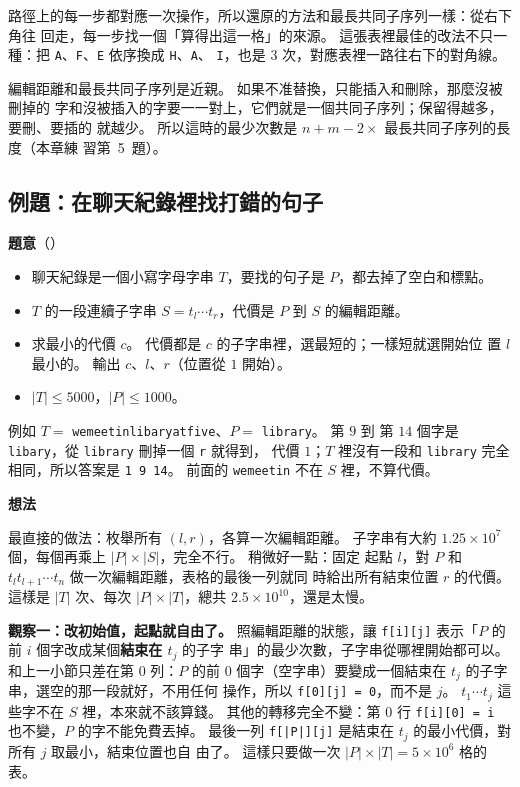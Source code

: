 路徑上的每一步都對應一次操作，所以還原的方法和最長共同子序列一樣：從右下角往
回走，每一步找一個「算得出這一格」的來源。 這張表裡最佳的改法不只一種：把
\texttt{A}、\texttt{F}、\texttt{E} 依序換成 \texttt{H}、\texttt{A}、
\texttt{I}，也是 $3$ 次，對應表裡一路往右下的對角線。

編輯距離和最長共同子序列是近親。 如果不准替換，只能插入和刪除，那麼沒被刪掉的
字和沒被插入的字要一一對上，它們就是一個共同子序列；保留得越多，要刪、要插的
就越少。 所以這時的最少次數是 $n + m - 2 \times$ 最長共同子序列的長度（本章練
習第~5~題）。

\subsection{例題：在聊天紀錄裡找打錯的句子}
\label{sec:ss-ex-typo}

\textbf{題意}（）

\begin{itemize}
\item 聊天紀錄是一個小寫字母字串 $T$，要找的句子是 $P$，都去掉了空白和標點。
\item $T$ 的一段連續子字串 $S = t_l \cdots t_r$，代價是 $P$ 到 $S$ 的編輯距離。
\item 求最小的代價 $c$。 代價都是 $c$ 的子字串裡，選最短的；一樣短就選開始位
置 $l$ 最小的。 輸出 $c$、$l$、$r$（位置從 $1$ 開始）。
\item $|T| \le 5000$，$|P| \le 1000$。
\end{itemize}

例如 $T = $ \texttt{wemeetinlibaryatfive}、$P = $ \texttt{library}。 第 $9$ 到
第 $14$ 個字是 \texttt{libary}，從 \texttt{library} 刪掉一個 \texttt{r} 就得到，
代價 $1$；$T$ 裡沒有一段和 \texttt{library} 完全相同，所以答案是
\texttt{1 9 14}。 前面的 \texttt{wemeetin} 不在 $S$ 裡，不算代價。

\textbf{想法}

最直接的做法：枚舉所有 $(l, r)$，各算一次編輯距離。 子字串有大約
$1.25 \times 10^7$ 個，每個再乘上 $|P| \times |S|$，完全不行。 稍微好一點：固定
起點 $l$，對 $P$ 和 $t_l t_{l+1} \cdots t_n$ 做一次編輯距離，表格的最後一列就同
時給出所有結束位置 $r$ 的代價。 這樣是 $|T|$ 次、每次 $|P| \times |T|$，總共
$2.5 \times 10^{10}$，還是太慢。

\textbf{觀察一：改初始值，起點就自由了。} 照編輯距離的狀態，讓
\texttt{f[i][j]} 表示「$P$ 的前 $i$ 個字改成某個\textbf{結束在 $t_j$} 的子字
串」的最少次數，子字串從哪裡開始都可以。 和上一小節只差在第 $0$ 列：$P$ 的前
$0$ 個字（空字串）要變成一個結束在 $t_j$ 的子字串，選空的那一段就好，不用任何
操作，所以 \texttt{f[0][j] = 0}，而不是 $j$。 $t_1 \cdots t_j$ 這些字不在
$S$ 裡，本來就不該算錢。 其他的轉移完全不變：第 $0$ 行
\texttt{f[i][0] = i} 也不變，$P$ 的字不能免費丟掉。 最後一列
\texttt{f[|P|][j]} 是結束在 $t_j$ 的最小代價，對所有 $j$ 取最小，結束位置也自
由了。 這樣只要做一次 $|P| \times |T| = 5 \times 10^6$ 格的表。


